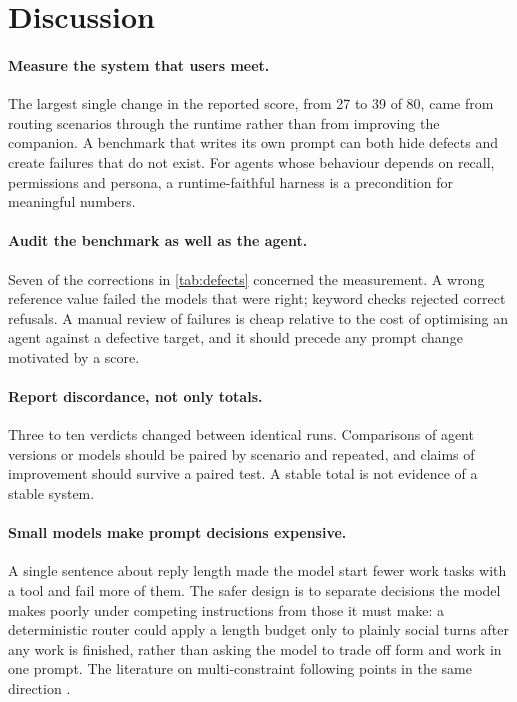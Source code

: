 \documentclass[11pt,a4paper]{article}
\begin{document}
\section{Discussion}\label{sec:discussion}
\paragraph{Measure the system that users meet.} The largest single change in the reported score, from 27 to 39 of 80, came from routing scenarios through the runtime rather than from improving the companion. A benchmark that writes its own prompt can both hide defects and create failures that do not exist. For agents whose behaviour depends on recall, permissions and persona, a runtime-faithful harness is a precondition for meaningful numbers.

\paragraph{Audit the benchmark as well as the agent.} Seven of the corrections in \cref{tab:defects} concerned the measurement. A wrong reference value failed the models that were right; keyword checks rejected correct refusals. A manual review of failures is cheap relative to the cost of optimising an agent against a defective target, and it should precede any prompt change motivated by a score.

\paragraph{Report discordance, not only totals.} Three to ten verdicts changed between identical runs. Comparisons of agent versions or models should be paired by scenario and repeated, and claims of improvement should survive a paired test. A stable total is not evidence of a stable system.

\paragraph{Small models make prompt decisions expensive.} A single sentence about reply length made the model start fewer work tasks with a tool and fail more of them. The safer design is to separate decisions the model makes poorly under competing instructions from those it must make: a deterministic router could apply a length budget only to plainly social turns after any work is finished, rather than asking the model to trade off form and work in one prompt. The literature on multi-constraint following points in the same direction \cite{multiply,decrim,cctu}.
\end{document}
